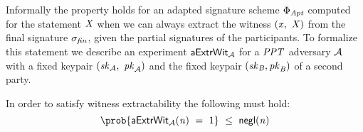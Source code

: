 \begin{definition}[\cnstWitnessExtractability]
    Informally the \cnstWitnessExtractability property holds for an adapted signature scheme $\Phi_{\mathit{Apt}}$ computed for the statement $\mathit{X}$ when we can always extract the witness
    $(\mathit{x} ,~ \mathit{X})$ from the final signature $\sigma_{\mathit{fin}}$, given the partial signatures of the participants.
    To formalize this statement we describe an experiment $\mathsf{aExtrWit_{\mathcal{A}}}$ for a $\mathit{PPT}$ adversary $\mathcal{A}$ with a fixed keypair $(\mathit{sk}_{\mathcal{A}} ,~ \mathit{pk}_{\mathcal{A}})$
    and the fixed keypair $(\mathit{sk}_{\mathit{B}}, \mathit{pk}_{\mathit{B}})$ of a second party.

    \begin{center}
        \fbox{
        \begin{varwidth}{\textwidth}
            \procedure[linenumbering]{$\procExpExt{\varN}$} {
            \varSet \opAssign \cnstEmptySet \\
            (\varMsg \opSeperate \varStatement) \opFunResult \cnstAdversary^{\procSignPtOracle{\cdot}}(\varPubKeyAdv) \\
            (\varSigPtAdv \opSeperate \varSigBob)\opFunResult \procSignPt{\varMsg}{\varSecKeyAdv}{\varSecKeyBob} \\
            \varSigAptAdv \opFunResult \cnstAdversary^{\procSignPtOracle{\cdot}}(\varPubKeyAdv \opSeperate \varSigPtAdv) \\
            \varSigFin \opFunResult \procFinSig{\varSigPtAdv}{\varSigBob} \\
            \funStar{\varWit} \opFunResult \procExtWit{\varSigFin}{\varSigBob}{\varSigAptAdv} \\
            \pcreturn (\varMsg \opNotIn \varSet \opAnd (\varStatement \opSeperate \funStar{\varWit}) \opNotIn \cnstRelation \opAnd \procVerf{\varMsg}{\varSigFin}{\varPubKeyAdv \opAddPoint \varPubKeyBob})
            }\\

            \procedure[linenumbering]{$\procSignPtOracle{\varMsg}$} {
            \varSet \opAssign \varSet \opUnion \varMsg \\
            \varSigPt \opFunResult \procSignPtSingle{\varMsg}{\varSecKey} \\
            \pcreturn \varSigPt
            }
        \end{varwidth}
        }
    \end{center}
    In order to satisfy witness extractability the following must hold:
    \[ \prob{\procExpExt{\varN} \opEq 1} \opSmEq \funNegl{\varN} \]
\end{definition}

